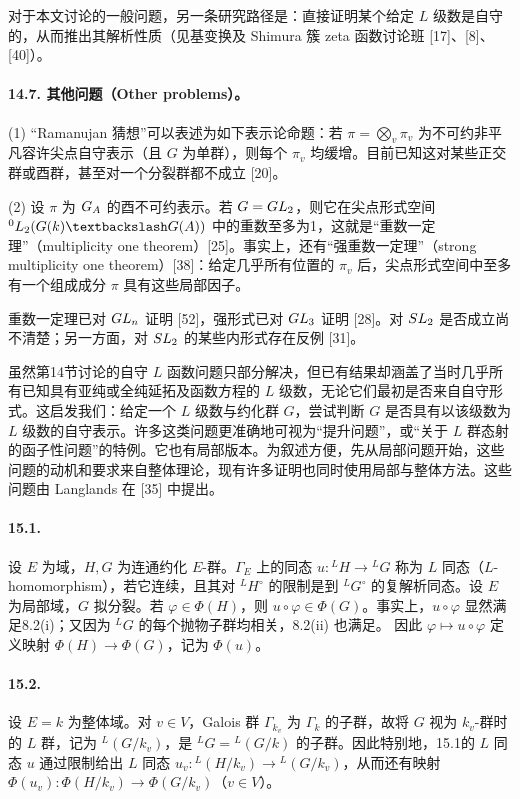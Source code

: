 对于本文讨论的一般问题，另一条研究路径是：直接证明某个给定 $L$ 级数是自守的，从而推出其解析性质（见基变换及 Shimura 簇 zeta 函数讨论班 [17]、[8]、[40]）。

\paragraph*{14.7. 其他问题（Other problems）。}
(1) “Ramanujan 猜想”可以表述为如下表示论命题：若 $\pi=\bigotimes_v\pi_v$ 为不可约非平凡容许尖点自守表示（且 $G$ 为单群），则每个 $\pi_v$ 均缓增。目前已知这对某些正交群或酉群，甚至对一个分裂群都不成立 [20]。

(2) 设 $\pi$ 为 $G_{A}$ 的酉不可约表示。若 $G=GL_2$，则它在尖点形式空间 ${}^0L_2(G(k)\backslash G(\A))$ 中的重数至多为1，这就是“重数一定理”（multiplicity one theorem）[25]。事实上，还有“强重数一定理”（strong multiplicity one theorem）[38]：给定几乎所有位置的 $\pi_v$ 后，尖点形式空间中至多有一个组成成分 $\pi$ 具有这些局部因子。

重数一定理已对 $GL_n$ 证明 [52]，强形式已对 $GL_3$ 证明 [28]。对 $SL_2$ 是否成立尚不清楚；另一方面，对 $SL_2$ 的某些内形式存在反例 [31]。

虽然第14节讨论的自守 $L$ 函数问题只部分解决，但已有结果却涵盖了当时几乎所有已知具有亚纯或全纯延拓及函数方程的 $L$ 级数，无论它们最初是否来自自守形式。这启发我们：给定一个 $L$ 级数与约化群 $G$，尝试判断 $G$ 是否具有以该级数为 $L$ 级数的自守表示。许多这类问题更准确地可视为“提升问题”，或“关于 $L$ 群态射的函子性问题”的特例。它也有局部版本。为叙述方便，先从局部问题开始，这些问题的动机和要求来自整体理论，现有许多证明也同时使用局部与整体方法。这些问题由 Langlands 在 [35] 中提出。

\paragraph*{15.1.} 设 $E$ 为域，$H,G$ 为连通约化 $E$-群。$\Gamma_E$ 上的同态 $u:{}^LH\to{}^LG$ 称为 $L$ 同态（$L$-homomorphism），若它连续，且其对 ${}^LH^\circ$ 的限制是到 ${}^LG^\circ$ 的复解析同态。设 $E$ 为局部域，$G$ 拟分裂。若 $\varphi\in\Phi(H)$，则 $u\circ\varphi\in\Phi(G)$。事实上，$u\circ\varphi$ 显然满足8.2(i)；又因为 ${}^LG$ 的每个抛物子群均相关，8.2(ii) 也满足。
因此 $\varphi\mapsto u\circ\varphi$ 定义映射 $\Phi(H)\to\Phi(G)$，记为 $\Phi(u)$。

\paragraph*{15.2.} 设 $E=k$ 为整体域。对 $v\in V$，Galois 群 $\Gamma_{k_v}$ 为 $\Gamma_k$ 的子群，故将 $G$ 视为 $k_v$-群时的 $L$ 群，记为 ${}^L(G/k_v)$，是 ${}^LG={}^L(G/k)$ 的子群。因此特别地，15.1的 $L$ 同态 $u$ 通过限制给出 $L$ 同态 $u_v:{}^L(H/k_v)\to{}^L(G/k_v)$，从而还有映射 $\Phi(u_v):\Phi(H/k_v)\to\Phi(G/k_v)$（$v\in V$）。

